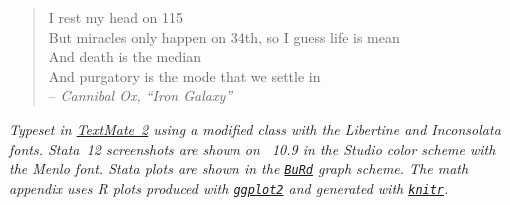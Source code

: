 \newpage

\begin{fullwidth}

	\thispagestyle{empty}
	\setlength{\parindent}{0pt}
	\setlength{\parskip}{\baselineskip}

	\vspace*{\fill} 

	\begin{center}
	\begin{verse} 
	  I rest my head on 115\\
	  But miracles only happen on 34th, so I guess life is mean\\
	  And death is the median\\
	  And purgatory is the mode that we settle in\\[1em]
  
	  -- \emph{Cannibal Ox, ``Iron Galaxy''}
	\end{verse}
	\end{center}

	\vspace*{\fill}

	\footnotesize{\emph{%
		Typeset in \href{https://github.com/textmate/textmate}{TextMate~2} %
		using a modified \href{https://code.google.com/p/tufte-latex/}{\TL} %
		class with the Libertine and Inconsolata fonts. %
		Stata~12 screenshots are shown on \OSX~10.9 in the Studio color scheme with the Menlo font. %
		Stata plots are shown in the %
		\href{https://github.com/briatte/burd}{\texttt{BuRd}} %
		graph scheme. %
    The math appendix uses R plots produced with \href{http://ggplot2.org/}{\texttt{ggplot2}} %
    and generated with \href{http://yihui.name/knitr/}{\texttt{knitr}}.
	}}

\end{fullwidth}
